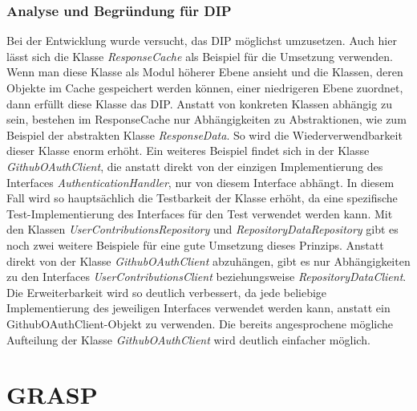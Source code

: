\subsubsection{Analyse und Begründung für DIP}
Bei der Entwicklung wurde versucht, das DIP möglichst umzusetzen.
Auch hier lässt sich die Klasse \textit{ResponseCache} als Beispiel für die Umsetzung verwenden.
Wenn man diese Klasse als Modul höherer Ebene ansieht und die Klassen, deren Objekte im Cache gespeichert werden können, einer niedrigeren Ebene zuordnet, dann erfüllt diese Klasse das DIP. 
Anstatt von konkreten Klassen abhängig zu sein, bestehen im ResponseCache nur Abhängigkeiten zu Abstraktionen, wie zum Beispiel der abstrakten Klasse \textit{ResponseData}.
So wird die Wiederverwendbarkeit dieser Klasse enorm erhöht.
\newline
Ein weiteres Beispiel findet sich in der Klasse \textit{GithubOAuthClient}, die anstatt direkt von der einzigen Implementierung des Interfaces \textit{AuthenticationHandler}, nur von diesem Interface abhängt.
In diesem Fall wird so hauptsächlich die Testbarkeit der Klasse erhöht, da eine spezifische Test-Implementierung des Interfaces für den Test verwendet werden kann.
\newline
Mit den Klassen \textit{UserContributionsRepository} und \textit{RepositoryDataRepository} gibt es noch zwei weitere Beispiele für eine gute Umsetzung dieses Prinzips.
Anstatt direkt von der Klasse \textit{GithubOAuthClient} abzuhängen, gibt es nur Abhängigkeiten zu den Interfaces \textit{UserContributionsClient} beziehungsweise \textit{RepositoryDataClient}.
Die Erweiterbarkeit wird so deutlich verbessert, da jede beliebige Implementierung des jeweiligen Interfaces verwendet werden kann, anstatt ein GithubOAuthClient-Objekt zu verwenden.
Die bereits angesprochene mögliche Aufteilung der Klasse \textit{GithubOAuthClient} wird deutlich einfacher möglich.

\newpage
\section{GRASP}

